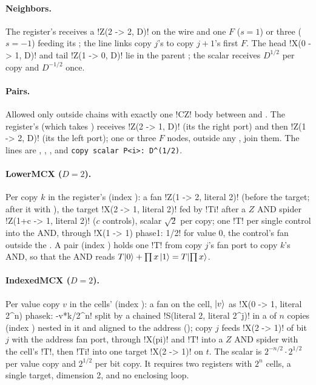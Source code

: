 \paragraph{Neighbors.} The register's \bbox{} receives a \azx!Z(2 -> 2, D)! on the wire and one
$F$ ($s=1$) or three ($s=-1$) feeding its ; the line  links copy $j$'s  to copy $j+1$'s first $F$. The head \azx!X(0 -> 1, D)! and
tail \azx!Z(1 -> 0, D)! lie in the parent \bbox{}; the scalar receives $D^{1/2}$ per copy and
$D^{-1/2}$ once.

\paragraph{Pairs.} Allowed only outside chains with exactly one \py!CZ! body between
 and . The register's \bbox{} (which takes ) receives
\azx!Z(2 -> 1, D)! (its  the right port) and then \azx!Z(1 -> 2, D)! (its 
the left port); one or three $F$ nodes, outside any \bbox{}, join them. The lines are
, , , and \texttt{copy scalar P<i>: D\^{}(1/2)}.

\paragraph{LowerMCX ($D=2$).} Per copy $k$ in the register's \bbox{} (index ): a fan
\azx!Z(1 -> 2, literal 2)! (before the target; after it with ), the target
\azx!X(2 -> 1, literal 2)! fed by \azx!Ti! after a $Z$ AND spider \azx!Z(1+c -> 1, literal 2)!
($c$ controls), scalar $\sqrt2$ per copy; one \azx!T! per single control into the AND, through
\azx!X(1 -> 1) phase{1: 1/2}! for value 0, the control's fan outside the \bbox. A pair \bbox{}
(index ) holds one \azx!T! from copy $j$'s fan port to copy $k$'s AND, so that the AND
reads $T\lvert 0 \rangle+\prod x\,\lvert 1 \rangle = T\lvert \prod x \rangle$.

\paragraph{IndexedMCX ($D=2$).} Per value copy $v$ in the cells' \bbox{} (index ): a fan
on the cell, $\lvert v \rangle$ as \azx!X(0 -> 1, literal 2^n) phase{k: -v*k/2^n}! split by a chained
\azx!S(literal 2, literal 2^j)! in a \bbox{} of $n$ copies (index ) nested in it and
aligned to the address \bbox{} (); copy $j$ feeds \azx!X(2 -> 1)! of bit
$j$ with the address fan port, through \azx!X(pi)! and \azx!T! into a $Z$ AND spider with the
cell's \azx!T!, then \azx!Ti! into one target \azx!X(2 -> 1)! on $t$. The scalar is
$2^{-n/2}\cdot2^{1/2}$ per value copy and $2^{1/2}$ per bit copy. It requires two registers with
$2^n$ cells, a single target, dimension 2, and no enclosing loop.

